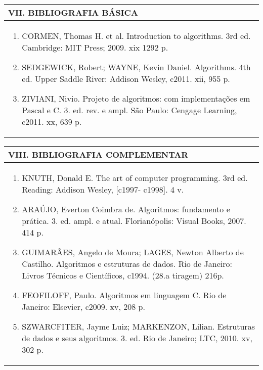 \documentclass[12pt]{article}
\begin{document}
\begin{longtable}{|L{1.025\textwidth}|} \hline
%
{\bf VII. BIBLIOGRAFIA BÁSICA} \\ \hline
\begin{enumerate}
%
\item CORMEN, Thomas H. et al. Introduction to algorithms. 3rd ed. Cambridge: MIT Press; 2009. xix 1292 p. 
\item SEDGEWICK, Robert; WAYNE, Kevin Daniel. Algorithms. 4th ed. Upper Saddle River: Addison Wesley, c2011. xii, 955 p. 
\item ZIVIANI, Nivio. Projeto de algoritmos: com implementações em Pascal e C. 3. ed. rev. e ampl. São Paulo: Cengage Learning, c2011. xx, 639 p.
\end{enumerate}
 \\ \hline
\end{longtable}


\begin{longtable}{|L{1.025\textwidth}|} \hline
%
{\bf VIII. BIBLIOGRAFIA COMPLEMENTAR} \\ \hline
\begin{enumerate}
\item KNUTH, Donald E. The art of computer programming. 3rd ed. Reading: Addison Wesley, [c1997- c1998]. 4 v. 
\item ARAÚJO, Everton Coimbra de. Algoritmos: fundamento e prática. 3. ed. ampl. e atual. Florianópolis: Visual Books, 2007. 414 p. 
\item GUIMARÃES, Angelo de Moura; LAGES, Newton Alberto de Castilho. Algoritmos e estruturas de dados. Rio de Janeiro: Livros Técnicos e Científicos, c1994. (28.a tiragem) 216p.
\item FEOFILOFF, Paulo. Algoritmos em linguagem C. Rio de Janeiro: Elsevier, c2009. xv, 208 p.
\item SZWARCFITER, Jayme Luiz; MARKENZON, Lilian. Estruturas de dados e seus algoritmos. 3. ed. Rio de Janeiro; LTC, 2010. xv, 302 p.
\end{enumerate}
 \\ \hline
\end{longtable}



\end{document}

